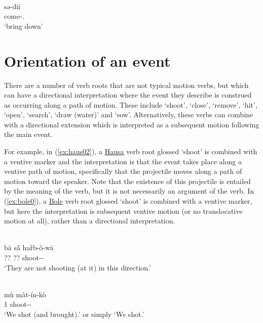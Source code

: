 \ex\label{ex:glav02}
 \\
\gll sə-dií	\\
come-.		\\
\glt `bring down'
\z 

\section{Orientation of an event} \label{sec:orientation}

There are a number of verb roots that are not typical motion verbs, but which can have a directional interpretation where the event they describe is construed as occurring along a path of motion. These include `shoot', `close', `remove', `hit', `open', `search', `draw (water)' and `sow'. Alternatively, these verbs can combine with a directional extension which is interpreted as a subsequent motion following the main event. 

For example, in (\ref{ex:haus02}), a \hyperref[haus]{Hausa} verb root glossed `shoot' is combined with a ventive marker and the interpretation is that the event takes place along a ventive path of motion, specifically that the projectile moves along a path of motion toward the speaker. Note that the existence of this projectile is entailed by the meaning of the verb, but it is not necessarily an argument of the verb. In (\ref{ex:bole0}), a \hyperref[bole]{Bole} verb root glossed `shoot' is combined with a ventive marker, but here the interpretation is subsequent ventive motion (or no translocative motion at all), rather than a directional interpretation.

\ea\label{ex:haus02}
 \\
\gll bā sā̀ har̃b-ô-wā	\\
?? ?? shoot-- \\
\glt `They are not shooting (at it) in this direction.'

\ex\label{ex:bole0}
 \\
\gll mù màt-ín-kò	\\
1 shoot-- \\
\glt `We shot (and brought).' or simply `We shot.'		
\z 

